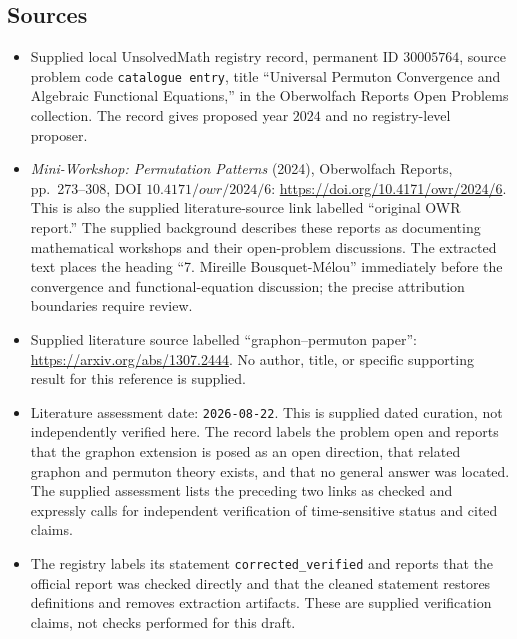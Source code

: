 \documentclass[11pt]{article}
\begin{document}
\subsection{Sources}
\begin{itemize}
\item Supplied local UnsolvedMath registry record, permanent ID \(30005764\), source problem code \texttt{catalogue entry}, title ``Universal Permuton Convergence and Algebraic Functional Equations,'' in the Oberwolfach Reports Open Problems collection. The record gives proposed year \(2024\) and no registry-level proposer.
\item \emph{Mini-Workshop: Permutation Patterns} (2024), Oberwolfach Reports, pp.\ 273--308, DOI \(10.4171/owr/2024/6\): \url{https://doi.org/10.4171/owr/2024/6}. This is also the supplied literature-source link labelled ``original OWR report.'' The supplied background describes these reports as documenting mathematical workshops and their open-problem discussions. The extracted text places the heading ``7. Mireille Bousquet-M\'elou'' immediately before the convergence and functional-equation discussion; the precise attribution boundaries require review.
\item Supplied literature source labelled ``graphon--permuton paper'': \url{https://arxiv.org/abs/1307.2444}. No author, title, or specific supporting result for this reference is supplied.
\item Literature assessment date: \texttt{2026-08-22}. This is supplied dated curation, not independently verified here. The record labels the problem open and reports that the graphon extension is posed as an open direction, that related graphon and permuton theory exists, and that no general answer was located. The supplied assessment lists the preceding two links as checked and expressly calls for independent verification of time-sensitive status and cited claims.
\item The registry labels its statement \texttt{corrected\_verified} and reports that the official report was checked directly and that the cleaned statement restores definitions and removes extraction artifacts. These are supplied verification claims, not checks performed for this draft.
\end{itemize}
\end{document}
